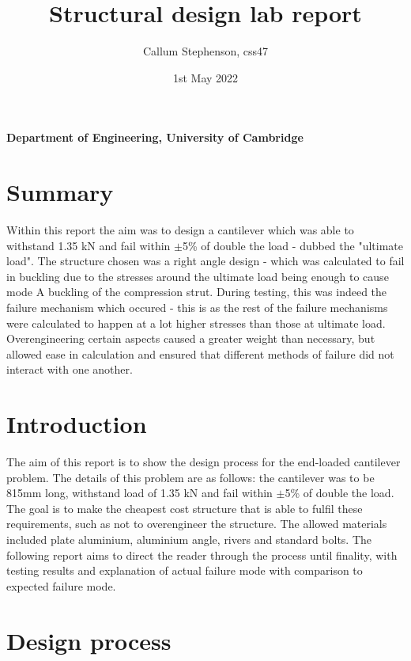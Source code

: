 \documentclass[12pt]{article}
\title{\textbf{Structural design lab report}}
\author{Callum Stephenson, css47}
\date{1st May 2022}
\begin{document}
    \begin{titlepage}
        \maketitle
        \thispagestyle{empty}
        \vspace{13cm}
        \textbf{Department of Engineering, University of Cambridge}
    \end{titlepage}
    \newpage
    \tableofcontents
    \newpage
    \section{Summary}
        Within this report the aim was to design a cantilever which was able to withstand 1.35 kN and fail within $\pm$5\% of double the load - dubbed the "ultimate load". 
        The structure chosen was a right angle design - which was calculated to fail in buckling due to the stresses around the ultimate load being enough to cause mode A buckling
        of the compression strut. During testing, this was indeed the failure mechanism which occured - this is as the rest of the failure mechanisms were calculated to happen at a lot
        higher stresses than those at ultimate load. Overengineering certain aspects caused a greater weight than necessary, but allowed ease in calculation and ensured that 
        different methods of failure did not interact with one another. 
    \section{Introduction}
        The aim of this report is to show the design process for the end-loaded cantilever problem. The details of this problem are as follows:
        the cantilever was to be 815mm long, withstand load of 1.35 kN and fail within $\pm$5\% of double the load. The goal is to make the cheapest
        cost structure that is able to fulfil these requirements, such as not to overengineer the structure. The allowed materials included plate aluminium,
        aluminium angle, rivers and standard bolts. The following report aims to direct the reader through the process until finality, with testing results
        and explanation of actual failure mode with comparison to expected failure mode.
    \section{Design process}
\end{document}
